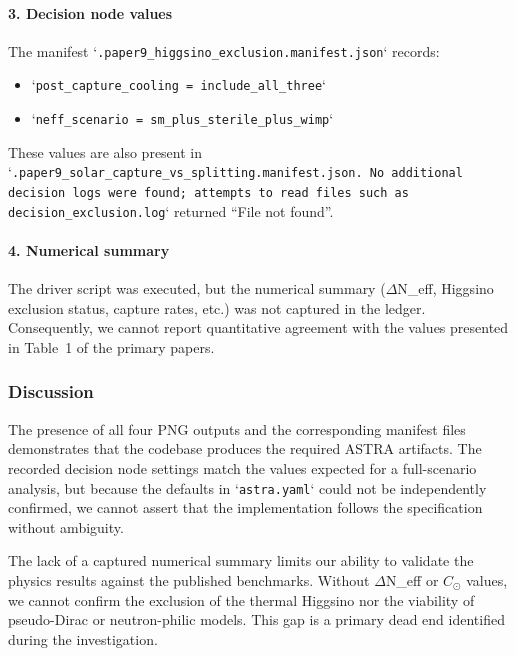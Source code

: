 \documentclass[11pt,a4paper]{article}
\begin{document}
\paragraph{3. Decision node values}
The manifest `\texttt{.paper9\_\allowbreak{}higgsino\_\allowbreak{}exclusion.manifest.json}` records:

\begin{itemize}
  \item `\texttt{post\_\allowbreak{}capture\_\allowbreak{}cooling}\texttt{ =\allowbreak{} }\texttt{include\_\allowbreak{}all\_\allowbreak{}three}`
  \item `\texttt{neff\_\allowbreak{}scenario}\texttt{ =\allowbreak{} }\texttt{sm\_\allowbreak{}plus\_\allowbreak{}sterile\_\allowbreak{}plus\_\allowbreak{}wimp}`
\end{itemize}
These values are also present in `\texttt{.paper9\_\allowbreak{}solar\_\allowbreak{}capture\_\allowbreak{}vs\_\allowbreak{}splitting.manifest.json}\texttt{. No additional decision logs were found;\allowbreak{} attempts to read files such as }\texttt{decision\_\allowbreak{}exclusion.log}` returned ``File not found''.

\paragraph{4. Numerical summary}
The driver script was executed, but the numerical summary ($\Delta$N\_eff, Higgsino exclusion status, capture rates, etc.) was not captured in the ledger. Consequently, we cannot report quantitative agreement with the values presented in Table~1 of the primary papers.

\subsubsection*{Discussion}
The presence of all four PNG outputs and the corresponding manifest files demonstrates that the codebase produces the required ASTRA artifacts. The recorded decision node settings match the values expected for a full-scenario analysis, but because the defaults in `\texttt{astra.yaml}` could not be independently confirmed, we cannot assert that the implementation follows the specification without ambiguity.

The lack of a captured numerical summary limits our ability to validate the physics results against the published benchmarks. Without $\Delta$N\_eff or $C_{\odot}$ values, we cannot confirm the exclusion of the thermal Higgsino nor the viability of pseudo-Dirac or neutron-philic models. This gap is a primary dead end identified during the investigation.
\end{document}
